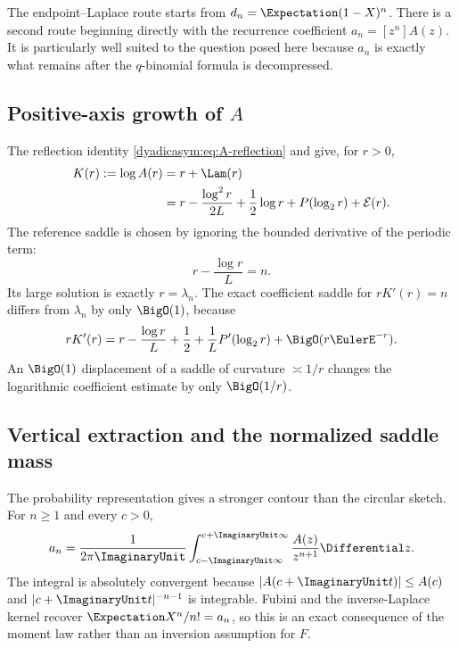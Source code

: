 \documentclass[11pt,oneside]{article}
\theoremstyle{definition}
\theoremstyle{remark}
\begin{document}
The endpoint--Laplace route starts from $d_n=\Expectation(1-X)^n$.  There is a second route beginning
directly with the recurrence coefficient $a_n=[z^n]A(z)$.  It is particularly well suited to
the question posed here because $a_n$ is exactly what remains after the $q$-binomial formula
is decompressed.

\subsection{Positive-axis growth of \texorpdfstring{$A$}{A}}

The reflection identity \eqref{dyadicasym:eq:A-reflection} and
 give, for $r>0$,
\begin{align}
 K(r):=\log A(r)
 ={}&r+\Lam(r)                                               \notag\\
 ={}&r-\frac{\log^2r}{2L}+\frac12\log r
 +P(\log_2r)+\mathcal E(r).                                \label{dyadicasym:eq:K-positive}
\end{align}
The reference saddle is chosen by ignoring the bounded derivative of the periodic term:
\begin{equation}
 r-\frac{\log r}{L}=n.                                      \label{dyadicasym:eq:reference-saddle}
\end{equation}
Its large solution is exactly $r=\lambda_n$.  The exact coefficient saddle for
$rK'(r)=n$ differs from $\lambda_n$ by only $\BigO(1)$, because
\begin{equation}
 rK'(r)=r-\frac{\log r}{L}+\frac12+\frac1L P'(\log_2r)
 +\BigO(r\EulerE^{-r}).                                          \label{dyadicasym:eq:exact-saddle-shift}
\end{equation}
An $\BigO(1)$ displacement of a saddle of curvature $\asymp1/r$ changes the logarithmic
coefficient estimate by only $\BigO(1/r)$.

\subsection{Vertical extraction and the normalized saddle mass}

The probability representation gives a stronger contour than the circular sketch.  For
$n\ge1$ and every $c>0$,
\begin{equation}
 a_n=\frac1{2\pi\ImaginaryUnit}\int_{c-\ImaginaryUnit\infty}^{c+\ImaginaryUnit\infty}
 \frac{A(z)}{z^{n+1}}\Differential z.                               \label{dyadicasym:eq:vertical-extraction}
\end{equation}
The integral is absolutely convergent because
$|A(c+\ImaginaryUnit t)|\le A(c)$ and $|c+\ImaginaryUnit t|^{-n-1}$ is integrable.  Fubini and the
inverse-Laplace kernel recover $\Expectation X^n/n!=a_n$, so this is an exact consequence of the
moment law rather than an inversion assumption for $F$.
\end{document}
